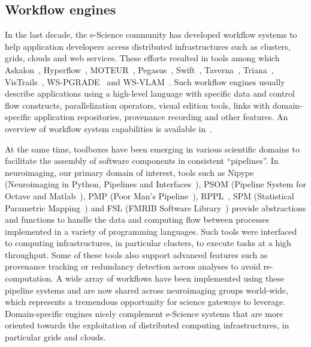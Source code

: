 \documentclass[preprint,3p,twocolumn]{elsarticle}
\begin{document}
\subsection{Workflow engines}

\label{sec:introduction-engines}
In the last decade, the e-Science community has developed workflow
systems to help application developers access distributed
infrastructures such as clusters, grids, clouds and web
services. These efforts resulted in tools among which
Askalon~\cite{fahringer2005askalon},
Hyperflow~\cite{balis2016hyperflow}, MOTEUR~\cite{GLAT-08i},
Pegasus~\cite{deelman2005pegasus,Deelman201517},
Swift~\cite{zhao2007swift}, Taverna~\cite{oinn2004taverna},
Triana~\cite{taylor2007triana}, VisTrails~\cite{callahan2006managing},
WS-PGRADE~\cite{Kacsuk2012} and
WS-VLAM~\cite{wsvlam}.  Such workflow engines usually describe
applications using a high-level language with specific data and control
flow constructs, parallelization operators, visual edition tools,
links with domain-specific application repositories, provenance
recording and other features. An overview of workflow system
capabilities is available in~\cite{deelman2009workflows}.

At the same time, toolboxes have been emerging in various scientific
domains to facilitate the assembly of software components in
consistent ``pipelines''. In neuroimaging, our primary domain of
interest, tools such as Nipype (Neuroimaging in Python, Pipelines and
Interfaces~\cite{gorgolewski2011nipype}), PSOM (Pipeline System for
Octave and Matlab~\cite{bellec2012pipeline}), 
PMP (Poor Man's Pipeline~\cite{Ad-DabbaghY2006}), RPPL~\cite{1174106}, SPM (Statistical
Parametric Mapping~\cite{ashburner2011spm}) and FSL (FMRIB Software
Library~\cite{Jenkinson2012782}) provide abstractions and functions to
handle the data and computing flow between processes implemented in a
variety of programming languages. Such tools were interfaced to
computing infrastructures, in particular
clusters, to execute tasks at a high throughput. Some of
these tools also support advanced features such as provenance
tracking or  redundancy detection across
analyses to avoid re-computation. A wide array of workflows
have been implemented using these pipeline systems and are now shared across
neuroimaging groups world-wide, which represents a tremendous
opportunity for science gateways to leverage. Domain-specific engines
nicely complement e-Science systems that are more oriented towards the
exploitation of distributed computing infrastructures, in particular
grids and clouds.
\end{document}
